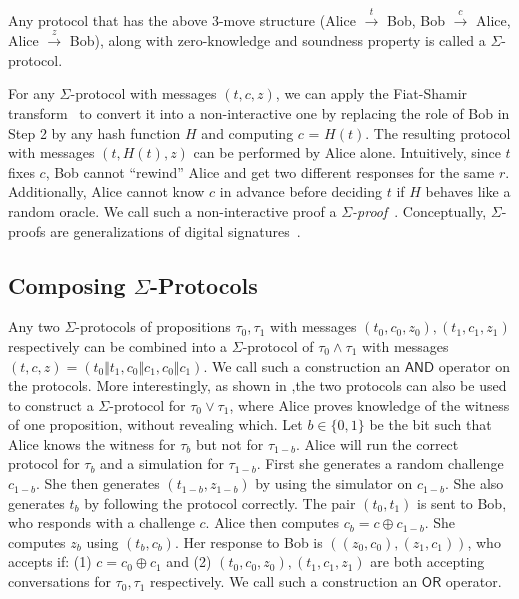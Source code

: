 \documentclass[11pt]{article}
\newcommand{\andnode}{\ensuremath{\mathsf{AND}}}
\newcommand{\ornode}{\ensuremath{\mathsf{OR}}}
\begin{document}
Any protocol that has the above 3-move structure (Alice $\stackrel{t}{\rightarrow}$ Bob, Bob $\stackrel{c}{\rightarrow}$ Alice, Alice $\stackrel{z}{\rightarrow}$ Bob), along with zero-knowledge and soundness property is called a $\Sigma$-protocol. 

For any $\Sigma$-protocol with messages $(t, c, z)$, we can apply the Fiat-Shamir transform~\cite{fiatshamir} to convert it into a non-interactive one by replacing the role of Bob in Step 2 by any hash function $H$ and computing $c$ = $H(t)$. The resulting protocol with messages $(t, H(t), z)$ can be performed by Alice alone. Intuitively, since $t$ fixes $c$, Bob cannot ``rewind'' Alice and get two different responses for the same $r$. Additionally, Alice cannot know $c$ in advance before deciding $t$ if $H$ behaves like a random oracle. We call such a non-interactive proof a {\em $\Sigma$-proof}~\cite{Cra96}. Conceptually, $\Sigma$-proofs are generalizations of digital signatures~\cite{CL06}.

\subsection{Composing $\Sigma$-Protocols}

Any two $\Sigma$-protocols of propositions $\tau_0, \tau_1$ with messages $(t_0, c_0, z_0), (t_1, c_1, z_1)$ respectively can be combined into a $\Sigma$-protocol of $\tau_0 \land \tau_1$ with messages $(t, c, z) = (t_0\Vert t_1,c_0\Vert c_1, c_0\Vert c_1)$. We call such a construction an $\andnode$ operator on the protocols. 
More interestingly, as shown in \cite{CDS94},the two protocols can also be used to construct a $\Sigma$-protocol for $\tau_0\lor \tau_1$, where Alice proves knowledge of the witness of one proposition, without revealing which. Let $b\in \{0, 1\}$ be the bit such that Alice knows the witness for $\tau_b$ but not for $\tau_{1-b}$. Alice will run the correct protocol for $\tau_b$ and a simulation for $\tau_{1-b}$. First she generates a random challenge $c_{1-b}$. She then generates $(t_{1-b}, z_{1-b})$ by using the simulator on $c_{1-b}$. She also generates $t_b$ by following the protocol correctly. The pair $(t_0, t_1)$ is sent to Bob, who responds with a challenge $c$. Alice then computes $c_b = c\oplus c_{1-b}$. She computes $z_b$ using $(t_b, c_b)$. Her response to Bob is $((z_0, c_0), (z_1, c_1))$, who accepts if: (1) $c = c_0 \oplus c_1$ and (2) $(t_0, c_0, z_0), (t_1, c_1, z_1)$ are both accepting conversations for $\tau_0, \tau_1$ respectively. We call such a construction an $\ornode$ operator. 
\end{document}
